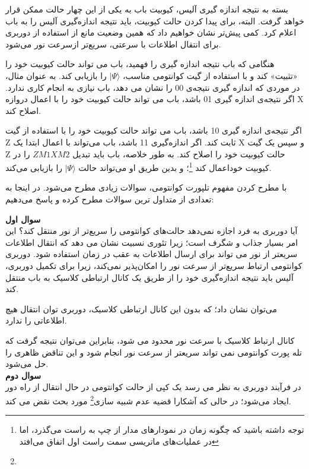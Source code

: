 \documentclass{book}
\begin{document}
بسته به نتیجه اندازه گیری آلیس، کیوبیت باب به یکی از این چهار حالت ممکن قرار خواهد گرفت. البته، برای پیدا کردن حالت کیوبیت، باید نتیجه اندازه‌گیری آلیس را به باب اعلام کرد.
کمی پیش‌‌تر نشان خواهیم داد که همین وضعیت مانع از استفاده از دوربری برای انتقال اطلاعات با سرعتی، سریع‌تر ازسرعت نور می‌شود.



هنگامی که باب نتیجه اندازه گیری را فهمید، باب می تواند حالت کیوبیت خود را «تثبیت» کند و با استفاده از گیت کوانتومی مناسب، $\vert \Psi \rangle$ را بازیابی کند. به عنوان مثال، در موردی که اندازه گیری نتیجه‌ی 00 را نشان می دهد، باب نیازی به انجام کاری ندارد. اگر نتیجه‌ی اندازه گیری 01 باشد، باب می تواند حالت کیوبیت خود را با اعمال دروازه X اصلاح کند.

اگر نتیجه‌ی اندازه گیری 10 باشد، باب می تواند حالت کیوبیت خود را با استفاده از گیت Z ثابت کند. اگر اندازه‌گیری 11 باشد، باب می‌تواند با اعمال ابتدا یک X و سپس یک گیت Z حالت کیوبیت خود را اصلاح کند. به طور خلاصه، باب باید تبدیل $  ZM1 XM2$ را در کیوبیت خوداعمال کند \footnote{توجه داشته باشید که چگونه زمان در نمودارهای مدار از چپ به راست می‌گذرد، اما در عملیات‌های ماتریسی سمت راست اول اتفاق می‌افتد}؛ و بدین طریق او می‌تواند حالت $\vert \Psi \rangle$ را بازیابی می‌کند. 

با مطرح کردن مفهوم تلپورت کوانتومی، سوالات زیادی مطرح می‌شود. در اینجا به تعدادی از متداول ترین سوالات مطرح کرده و پاسخ می‌دهیم:

\textbf{سوال اول} \\
آیا دوربری به فرد اجازه نمی‌دهد حالت‌های کوانتومی را سریع‌تر از نور منتقل کند؟ این امر بسیار جذاب و شگرف است؛ زیرا تئوری نسبیت نشان می دهد که انتقال اطلاعات سریعتر از نور می تواند برای ارسال اطلاعات به عقب در زمان استفاده شود. دوربری کوانتومی ارتباط سریع‌تر از سرعت نور را امکان‌پذیر نمی‌کند، زیرا برای تکمیل دوربری، آلیس باید نتیجه اندازه‌گیری خود را از طریق یک کانال ارتباطی کلاسیک به باب منتقل کند.

می‌توان نشان داد؛ که بدون این کانال ارتباطی کلاسیک، دوربری توان انتقال هیچ اطلاعاتی را ندارد.

کانال ارتباط کلاسیک با سرعت نور محدود می شود، بنابراین می‌توان نتیجه گرفت که تله پورت کوانتومی نمی تواند سریعتر از سرعت نور انجام شود و این تناقض ظاهری را حل می‌شود. \\


\textbf{سوال دوم}\\
در فرآیند دوربری به نظر می رسد یک کپی از حالت کوانتومی در حال انتقال از راه دور ایجاد می‌شود؛ در حالی که آشکارا قضیه عدم شبیه سازی\footnote{} مورد بحث نقض می کند.
\end{document}
